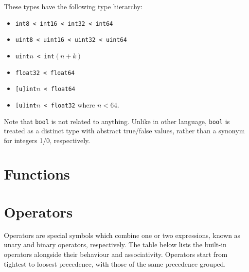 \documentclass{article}
\begin{document}

    These types have the following type hierarchy:
    \begin{itemize}
        \item \texttt{int8 < int16 < int32 < int64}
        \item \texttt{uint8 < uint16 < uint32 < uint64}
        \item \texttt{uint\(n\) < int\((n+k)\)}
        \item \texttt{float32 < float64}
        \item \texttt{[u]int\(n\) < float64}
        \item \texttt{[u]int\(n\) < float32} where \(n < 64\).
    \end{itemize}

    Note that \texttt{bool} is not related to anything.
    Unlike in other language, \texttt{bool} is treated as a distinct type with abstract true/false values, rather than a synonym for integers 1/0, respectively.

    \section{Functions}

    \section{Operators}

    Operators are special symbols which combine one or two expressions, known as unary and binary operators, respectively.
    The table below lists the built-in operators alongside their behaviour and associativity.
    Operators start from tightest to loosest precedence, with those of the same precedence grouped.
\end{document}
